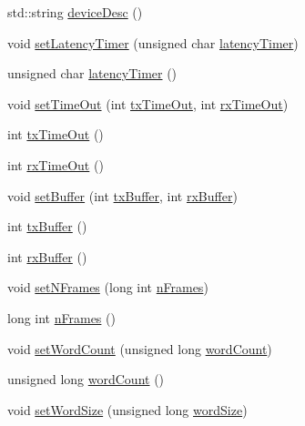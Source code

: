 \begin{DoxyCompactItemize}
\item 
std\+::string \hyperlink{classUsbFTMLInterface_ab541b4c57c1e7e947037acbfebc3fe3b}{device\+Desc} ()
\item 
void \hyperlink{classUsbFTMLInterface_a3625ccc604bbf5e707b3f5d91bc8f1bb}{set\+Latency\+Timer} (unsigned char \hyperlink{classUsbFTMLInterface_ac94dcd155b2e060d5fe04ccfbbb4de8d}{latency\+Timer})
\item 
unsigned char \hyperlink{classUsbFTMLInterface_ac94dcd155b2e060d5fe04ccfbbb4de8d}{latency\+Timer} ()
\item 
void \hyperlink{classUsbFTMLInterface_a93f8a5e14d22d36e29ffa367d60faca5}{set\+Time\+Out} (int \hyperlink{classUsbFTMLInterface_ad7e76fd952273faf094bf3475b2963da}{tx\+Time\+Out}, int \hyperlink{classUsbFTMLInterface_a106df14066462a38f7e4849c9d15828a}{rx\+Time\+Out})
\item 
int \hyperlink{classUsbFTMLInterface_ad7e76fd952273faf094bf3475b2963da}{tx\+Time\+Out} ()
\item 
int \hyperlink{classUsbFTMLInterface_a106df14066462a38f7e4849c9d15828a}{rx\+Time\+Out} ()
\item 
void \hyperlink{classUsbFTMLInterface_a0223b6508fe1ac8da3aee952da113b1a}{set\+Buffer} (int \hyperlink{classUsbFTMLInterface_ada338c9311fdb6d788a951f41cf9101f}{tx\+Buffer}, int \hyperlink{classUsbFTMLInterface_a41db8f21098bca8fb7a85ce1058ab10b}{rx\+Buffer})
\item 
int \hyperlink{classUsbFTMLInterface_ada338c9311fdb6d788a951f41cf9101f}{tx\+Buffer} ()
\item 
int \hyperlink{classUsbFTMLInterface_a41db8f21098bca8fb7a85ce1058ab10b}{rx\+Buffer} ()
\item 
void \hyperlink{classUsbFTMLInterface_a3a0a9d323631790c2db210fdcc85e89b}{set\+N\+Frames} (long int \hyperlink{classUsbFTMLInterface_a55531536a54b736b9c9c38bb792ec4c9}{n\+Frames})
\item 
long int \hyperlink{classUsbFTMLInterface_a55531536a54b736b9c9c38bb792ec4c9}{n\+Frames} ()
\item 
void \hyperlink{classUsbFTMLInterface_a3061389b73d2c2be1d53007723f9280e}{set\+Word\+Count} (unsigned long \hyperlink{classUsbFTMLInterface_a844ab72bfe0d3e14dd16f607a7c14905}{word\+Count})
\item 
unsigned long \hyperlink{classUsbFTMLInterface_a844ab72bfe0d3e14dd16f607a7c14905}{word\+Count} ()
\item 
void \hyperlink{classUsbFTMLInterface_a8f54e893ac36ae74bd4702ae649b79dd}{set\+Word\+Size} (unsigned long \hyperlink{classUsbFTMLInterface_ac313f412cbda6222ef817cb46083e2b3}{word\+Size})

\end{DoxyCompactItemize}
